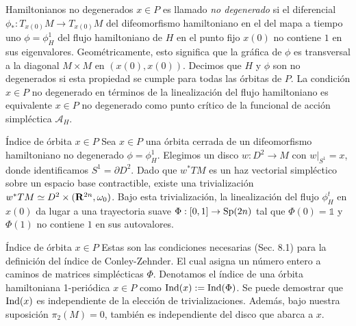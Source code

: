 \documentclass{beamer}
\def\R\re
\def \R{{\bf R}}
\def \re{{\mathbb R}}
\begin{document}
\begin{frame}{Hamiltonianos no degenerados}
$x \in P$ es llamado {\it no degenerado} si el diferencial
$\phi_* : T_{x(0)}M \to T_{x(0)}M $ del difeomorfismo hamiltoniano en el del mapa a tiempo uno $\phi=\phi_H^1$ del flujo hamiltoniano de $H$ en el punto fijo $x(0)$ no contiene $1$ en sus eigenvalores. \pause Geométricamente, esto significa que la gráfica de $\phi$ es transversal a la diagonal $M \times M$ en $(x(0),x(0))$. \pause Decimos que $H$ y $\phi$ son no degenerados si esta propiedad se cumple para todas las órbitas de $P$. \pause La condición $x \in P$ no degenerado en términos de la linealización del flujo hamiltoniano es equivalente $x \in P$ no degenerado como punto crítico de la funcional de acción simpléctica $\mathcal A_H$.

\end{frame}

\begin{frame}{Índice de órbita $x\in P$}
Sea $x \in P$ una órbita cerrada de un difeomorfismo hamiltoniano no degenerado $\phi=\phi_H^1$. \pause
Elegimos un disco $w: D^2 \to M$ con $w|_{S^1}=x$, donde identificamos $S^1 = \partial D^2$. \pause
Dado que $w^*TM$ es un haz vectorial simpléctico sobre un espacio base contractible, existe una trivialización $w^*TM \simeq D^2 \times (\R^{2n}, \omega_0)$. \pause  Bajo esta trivialización, la linealización del flujo $\phi_H^t$ en $x(0)$ da lugar a una trayectoria suave $\Phi: [0,1] \to {\rm Sp}(2n)$ tal que $\Phi(0) = \mathds{1}$ y $\Phi(1)$ no contiene $1$ en sus autovalores. 




\end{frame}

\begin{frame}{Índice de órbita $x\in P$}
Estas son las condiciones necesarias (Sec. 8.1) para la definición del índice de Conley-Zehnder. El cual asigna un número entero a caminos de matrices simplécticas $\Phi$. \pause Denotamos el índice de una órbita hamiltoniana 1-periódica $x \in P$ como ${\rm Ind}(x) := {\rm Ind}(\Phi)$. Se puede demostrar que ${\rm Ind}(x)$ es independiente de la elección de trivializaciones. Además, bajo nuestra suposición $\pi_2(M) = 0$, también es independiente del disco que abarca a $x$.

\end{frame}
\end{document}
